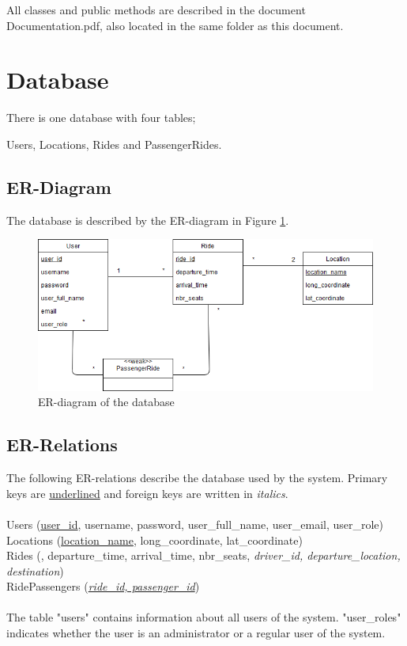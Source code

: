 \documentclass{article}
\begin{document}
All classes and public methods are described in the document Documentation.pdf, also located in the same folder as this document.

\section{Database}
    There is one database with four tables;
    
    Users, Locations, Rides and PassengerRides.
\subsection{ER-Diagram}
The database is described by the ER-diagram in Figure \ref{fig:er}.
\begin{figure}[h]
  \centering
  \includegraphics[scale=0.52]{ERDiagram.png}
  \caption{ER-diagram of the database}
  \label{fig:er}
\end{figure}

\subsection{ER-Relations}
The following ER-relations describe the database used by the system. Primary keys are \underline{underlined} and foreign keys are written in \textit{italics}.
\\ \\
Users (\underline{user\_id}, username, password, user\_full\_name, user\_email, user\_role)
\\
Locations (\underline{location\_name}, long\_coordinate, lat\_coordinate)
\\
Rides (, departure\_time, arrival\_time, nbr\_seats, \textit{driver\_id, departure\_location, destination})
\\
RidePassengers (\underline{\textit{ride\_id, passenger\_id}})
\\ \\
The table "users" contains information about all users of the system. "user\_roles" indicates whether the user is an administrator or a regular user of the system.
\end{document}
